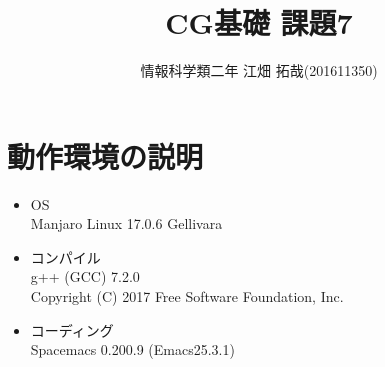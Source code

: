 \documentclass{scrartcl}
\author{情報科学類二年 江畑 拓哉(201611350)}
\date{}
\title{CG基礎 課題7}
\begin{document}
\maketitle

\section{動作環境の説明}
\label{sec:orgf7c52f6}
\begin{itemize}
\item OS\\
Manjaro Linux 17.0.6 Gellivara\\
\item コンパイル\\
g++ (GCC) 7.2.0\\
Copyright (C) 2017 Free Software Foundation, Inc.\\
\item コーディング\\
Spacemacs 0.200.9 (Emacs25.3.1)\\
\end{itemize}
\end{document}
